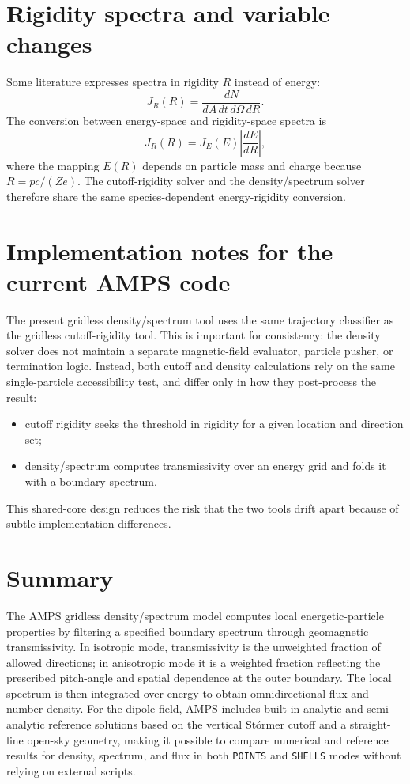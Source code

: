 \documentclass[11pt]{article}
\begin{document}
\section{Rigidity spectra and variable changes}
Some literature expresses spectra in rigidity $R$ instead of energy:
\begin{equation}
  J_R(R)=\frac{dN}{dA\,dt\,d\Omega\,dR}.
\end{equation}
The conversion between energy-space and rigidity-space spectra is
\begin{equation}
  J_R(R)=J_E(E)\left|\frac{dE}{dR}\right|,
\end{equation}
where the mapping $E(R)$ depends on particle mass and charge because
$R=pc/(Ze)$. The cutoff-rigidity solver and the density/spectrum solver therefore
share the same species-dependent energy-rigidity conversion.

\section{Implementation notes for the current AMPS code}
The present gridless density/spectrum tool uses the same trajectory classifier as
the gridless cutoff-rigidity tool. This is important for consistency: the density
solver does not maintain a separate magnetic-field evaluator, particle pusher, or
termination logic. Instead, both cutoff and density calculations rely on the same
single-particle accessibility test, and differ only in how they post-process the
result:
\begin{itemize}
  \item cutoff rigidity seeks the threshold in rigidity for a given location and
        direction set;
  \item density/spectrum computes transmissivity over an energy grid and folds it
        with a boundary spectrum.
\end{itemize}
This shared-core design reduces the risk that the two tools drift apart because
of subtle implementation differences.

\section{Summary}
The AMPS gridless density/spectrum model computes local energetic-particle
properties by filtering a specified boundary spectrum through geomagnetic
transmissivity. In isotropic mode, transmissivity is the unweighted fraction of
allowed directions; in anisotropic mode it is a weighted fraction reflecting the
prescribed pitch-angle and spatial dependence at the outer boundary. The local
spectrum is then integrated over energy to obtain omnidirectional flux and number
density. For the dipole field, AMPS includes built-in analytic and semi-analytic
reference solutions based on the vertical St\'ormer cutoff and a straight-line
open-sky geometry, making it possible to compare numerical and reference results
for density, spectrum, and flux in both \texttt{POINTS} and \texttt{SHELLS} modes
without relying on external scripts.
\end{document}

